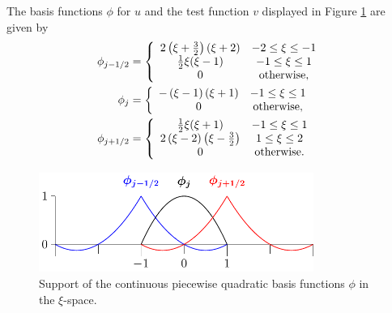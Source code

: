 The basis functions $\phi$ for $u$ and the test function $v$ displayed in Figure \ref{fig:P2ContBasisAPP} are given by
\begin{subequations}
	\label{eqn:App1:PhiDef}
\begin{align}
\phi_{j-1/2} &= \left\lbrace \begin{array}{c c}
2 \left(\xi + \frac{3}{2}\right)\left(\xi + 2\right) & -2 \le \xi \le -1\\
\frac{1}{2}\xi(\xi - 1) & -1 \le \xi \le 1\\
0 & \text{otherwise} ,\end{array} \right.  \\
\phi_{j} &= \left\lbrace \begin{array}{c c}
-\left(\xi - 1\right)\left(\xi + 1\right) & -1 \le \xi \le 1\\
0 & \text{otherwise},
\end{array} \right.  \\ 
\phi_{j+1/2} &= \left\lbrace \begin{array}{c c}
\frac{1}{2}\xi(\xi + 1) & -1 \le \xi \le 1\\
2\left(\xi - 2\right)\left(\xi - \frac{3}{2} \right) & 1 \le \xi \le 2\\
0 & \text{otherwise}.
\end{array} \right. 
\end{align}
\end{subequations}
\begin{figure}
	\centering
	\includegraphics[width=0.8\textwidth]{./app1/Figures/P2.pdf}
	\caption{Support of the continuous piecewise quadratic basis functions $\phi$ in the $\xi$-space.}
	\label{fig:P2ContBasisAPP}
\end{figure}

